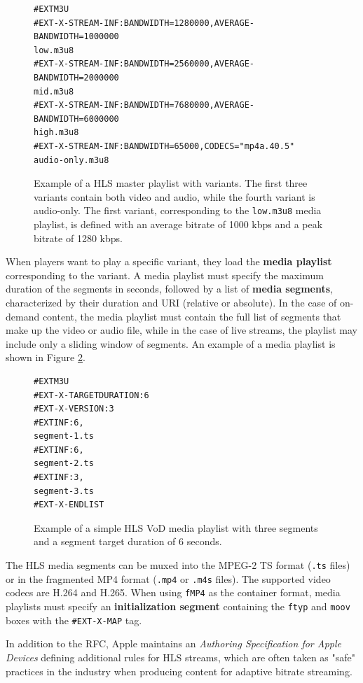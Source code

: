\begin{figure}[h]
    \centering
    \begin{verbatim}
#EXTM3U
#EXT-X-STREAM-INF:BANDWIDTH=1280000,AVERAGE-BANDWIDTH=1000000
low.m3u8
#EXT-X-STREAM-INF:BANDWIDTH=2560000,AVERAGE-BANDWIDTH=2000000
mid.m3u8
#EXT-X-STREAM-INF:BANDWIDTH=7680000,AVERAGE-BANDWIDTH=6000000
high.m3u8
#EXT-X-STREAM-INF:BANDWIDTH=65000,CODECS="mp4a.40.5"
audio-only.m3u8
    \end{verbatim}
	\caption{Example of a HLS master playlist with variants. The first three variants contain both video and audio, while the fourth variant is audio-only. The first variant, corresponding to the \texttt{low.m3u8} media playlist, is defined with an average bitrate of 1000 kbps and a peak bitrate of 1280 kbps.}
	\label{fig:hls_master}
\end{figure}

When players want to play a specific variant, they load the \textbf{media playlist} corresponding to the variant. A media playlist must specify the maximum duration of the segments in seconds, followed by a list of \textbf{media segments}, characterized by their duration and URI (relative or absolute). In the case of on-demand content, the media playlist must contain the full list of segments that make up the video or audio file, while in the case of live streams, the playlist may include only a sliding window of segments. An example of a media playlist is shown in Figure \ref{fig:hls_media}.

\begin{figure}[h]
    \centering
    \begin{verbatim}
#EXTM3U
#EXT-X-TARGETDURATION:6
#EXT-X-VERSION:3
#EXTINF:6,
segment-1.ts
#EXTINF:6,
segment-2.ts
#EXTINF:3,
segment-3.ts
#EXT-X-ENDLIST
    \end{verbatim}
	\caption{Example of a simple HLS VoD media playlist with three segments and a segment target duration of 6 seconds.}
	\label{fig:hls_media}
\end{figure}

The HLS media segments can be muxed into the MPEG-2 TS format (\texttt{.ts} files) or in the fragmented MP4 format (\texttt{.mp4} or \texttt{.m4s} files). The supported video codecs are H.264 and H.265. When using \texttt{fMP4} as the container format, media playlists must specify an \textbf{initialization segment} containing the \texttt{ftyp} and \texttt{moov} boxes with the \texttt{\#EXT-X-MAP} tag.

In addition to the RFC, Apple maintains an \textit{Authoring Specification for Apple Devices} defining additional rules for HLS streams, which are often taken as "safe" practices in the industry when producing content for adaptive bitrate streaming.\cite{hlsauthoring}

